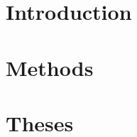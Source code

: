\documentclass[a5paper,11pt,twoside]{article}
\begin{document}
 

% 

\section{Introduction}


\section{Methods}


\section{Theses}

\end{document}
